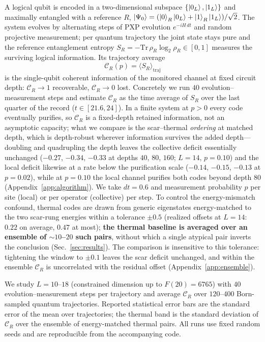 \documentclass[a4paper,11pt,twocolumn,unpublished]{quantumarticle}
\newcommand{\CR}{\mathcal{C}_R}
\begin{document}
A logical qubit is encoded in a two-dimensional subspace
$\{\ket{0_L},\ket{1_L}\}$ and maximally entangled with a reference $R$,
$\ket{\Psi_0}=(\ket{0}_R\ket{0_L}+\ket{1}_R\ket{1_L})/\sqrt2$. The system
evolves by alternating steps of PXP evolution $e^{-iH\,dt}$ and random projective
measurement; per quantum trajectory the joint state stays pure and the reference
entanglement entropy $S_R=-\mathrm{Tr}\,\rho_R\log_2\rho_R\in[0,1]$ measures the
surviving logical information. Its trajectory average
\begin{equation}
\CR(p) = \big\langle S_R \big\rangle_{\text{traj}}
\end{equation}
is the single-qubit coherent information of the monitored channel at fixed
circuit depth: $\CR\to1$ recoverable, $\CR\to0$ lost. Concretely we run $40$
evolution--measurement steps and estimate $\CR$ as the time average of $S_R$
over the last quarter of the record ($t\in[21.6,24]$). In a finite system at
$p>0$ every code eventually purifies, so $\CR$ is a fixed-depth retained
information, not an asymptotic capacity; what we compare is the scar--thermal
\emph{ordering} at matched depth, which is depth-robust wherever information
survives the added depth---doubling and quadrupling the depth leaves the
collective deficit essentially unchanged ($-0.27$, $-0.34$, $-0.33$ at
depths $40$, $80$, $160$; $L{=}14$, $p{=}0.10$) and the local deficit
likewise at a rate below the purification scale ($-0.14$, $-0.15$, $-0.13$
at $p{=}0.02$), while at $p=0.10$ the local channel purifies both codes
beyond depth $80$ (Appendix~\ref{app:algorithm}). We take
$dt=0.6$ and measurement probability $p$ per site (local) or per operator
(collective) per step. To control the
energy-mismatch confound, thermal codes are drawn from generic eigenstates
energy-matched to the two scar-rung energies within a tolerance $\pm0.5$
(realized offsets at $L{=}14$: $0.22$ on average, $0.47$ at most);
\textbf{the thermal baseline is averaged over an ensemble of $\sim\!10$--$20$
such pairs}, without which a single atypical pair inverts the conclusion
(Sec.~\ref{sec:results}). The comparison is insensitive to this tolerance:
tightening the window to $\pm0.1$ leaves the scar deficit unchanged, and
within the ensemble $\CR$ is uncorrelated with the residual offset
(Appendix~\ref{app:ensemble}).

We study $L=10$--$18$ (constrained dimension up to $F(20)=6765$) with $40$
evolution--measurement steps per trajectory and average $\CR$ over $120$--$400$
Born-sampled quantum trajectories. Reported statistical error bars are the
standard error of the mean over trajectories; the thermal band is the standard
deviation of $\CR$ over the ensemble of energy-matched thermal pairs. All runs
use fixed random seeds and are reproducible from the accompanying code.
\end{document}
